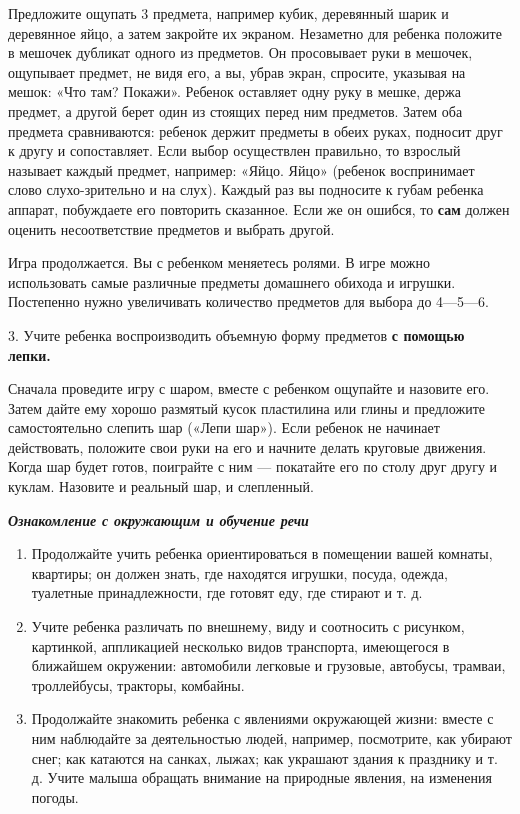 \documentclass[a5paper]{book}
\renewcommand{\emph}[1]{\textit{#1}}
\begin{document}
Предложите ощупать 3 предмета, например кубик, деревянный шарик и
деревянное яйцо, а затем закройте их экраном. Незаметно для ребенка
положите в мешочек дубликат одного из предметов. Он просовывает руки в
мешочек, ощупывает предмет, не видя его, а вы, убрав экран, спросите,
указывая на мешок: «Что там? Покажи». Ребенок оставляет одну руку в
мешке, держа предмет, а другой берет один из стоящих перед ним
предметов. Затем оба предмета сравниваются: ребенок держит предметы в
обеих руках, подносит друг к другу и сопоставляет. Если выбор
осуществлен правильно, то взрослый называет каждый предмет, например:
«Яйцо. Яйцо» (ребенок воспринимает слово слухо-зрительно и на слух).
Каждый раз вы подносите к губам ребенка аппарат, побуждаете его
повторить сказанное. Если же он ошибся, то \textbf{сам} должен оценить
несоответствие предметов и выбрать другой.

Игра продолжается. Вы с ребенком меняетесь ролями. В игре можно
использовать самые различные предметы домашнего обихода и игрушки.
Постепенно нужно увеличивать количество предметов для выбора до
4---5---6.

3. Учите ребенка воспроизводить объемную форму предметов \textbf{с
помощью лепки.}

Сначала проведите игру с шаром, вместе с ребенком ощупайте и назовите
его. Затем дайте ему хорошо размятый кусок пластилина или глины и
предложите самостоятельно слепить шар («Лепи шар»). Если ребенок не
начинает действовать, положите свои руки на его и начните делать
круговые движения. Когда шар будет готов, поиграйте с ним --- покатайте
его по столу друг другу и куклам. Назовите и реальный шар, и слепленный.

\emph{\textbf{Ознакомление с окружающим и обучение речи}}


\begin{enumerate}
\def\labelenumi{\arabic{enumi}.}
\item
  
  Продолжайте учить ребенка ориентироваться в помещении вашей комнаты,
  квартиры; он должен знать, где находятся игрушки, посуда, одежда,
  туалетные принадлежности, где готовят еду, где стирают и т. д.
  
\item
  
  Учите ребенка различать по внешнему, виду и соотносить с рисунком,
  картинкой, аппликацией несколько видов транспорта, имеющегося в
  ближайшем окружении: автомобили легковые и грузовые, автобусы,
  трамваи, троллейбусы, тракторы, комбайны.
  
\item
  
  Продолжайте знакомить ребенка с явлениями окружающей жизни: вместе с
  ним наблюдайте за деятельностью людей, например, посмотрите, как
  убирают снег; как катаются на санках, лыжах; как украшают здания к
  празднику и т. д. Учите малыша обращать внимание на природные явления,
  на изменения погоды.
  
\end{enumerate}
\end{document}
